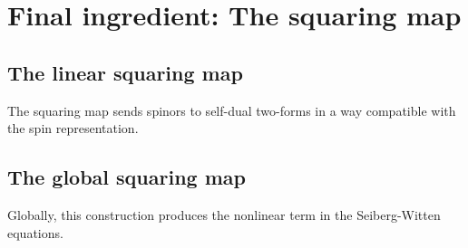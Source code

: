 \section{Final ingredient: The squaring map}
\subsection{The linear squaring map}
The squaring map sends spinors to self-dual two-forms in a way compatible with the spin representation.

\subsection{The global squaring map}
Globally, this construction produces the nonlinear term in the Seiberg-Witten equations.
